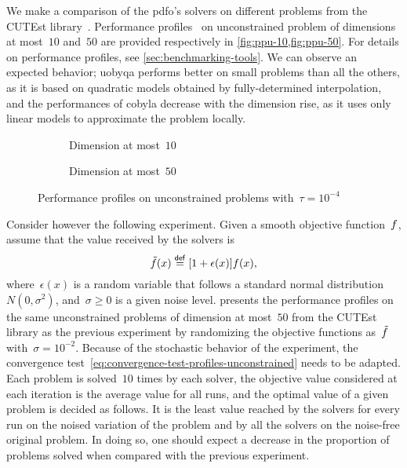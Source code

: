 We make a comparison of the \gls{pdfo}'s solvers on different problems from the CUTEst library~\cite{Gould_Orban_Toint_2015}.
Performance profiles~\cite{Dolan_More_2002,More_Wild_2009} on unconstrained problem of dimensions at most~$10$ and~$50$ are provided respectively in \cref{fig:ppu-10,fig:ppu-50}.
For details on performance profiles, see \cref{sec:benchmarking-tools}.
We can observe an expected behavior; \gls{uobyqa} performs better on small problems than all the others, as it is based on quadratic models obtained by fully-determined interpolation, and the performances of \gls{cobyla} decrease with the dimension rise, as it uses only linear models to approximate the problem locally.

\begin{figure}[ht]
    \begin{subfigure}[b]{0.49\textwidth}
        \centering
        \caption{Dimension at most~$10$}
        \label{fig:ppu-10}
    \end{subfigure}
    \hfill
    \begin{subfigure}[b]{0.49\textwidth}
        \centering
        \caption{Dimension at most~$50$}
        \label{fig:ppu-50}
    \end{subfigure}
    \caption{Performance profiles on unconstrained problems with~$\tau = 10^{-4}$}
\end{figure}

Consider however the following experiment.
Given a smooth objective function~$f$, assume that the value received by the solvers is
\begin{equation*}
    \tilde{\obj}(\iter) \eqdef [1 + \epsilon(\iter)] \obj(\iter),
\end{equation*}
where~$\epsilon(x)$ is a random variable that follows a standard normal distribution~$N(0, \sigma^2)$, and~$\sigma \ge 0$ is a given noise level.
 presents the performance profiles on the same unconstrained problems of dimension at most~$50$ from the CUTEst library as the previous experiment by randomizing the objective functions as~$\tilde{f}$ with~$\sigma = 10^{-2}$.
Because of the stochastic behavior of the experiment, the convergence test~\cref{eq:convergence-test-profiles-unconstrained} needs to be adapted.
Each problem is solved~$10$ times by each solver, the objective value considered at each iteration is the average value for all runs, and the optimal value of a given problem is decided as follows.
It is the least value reached by the solvers for every run on the noised variation of the problem and by all the solvers on the noise-free original problem.
In doing so, one should expect a decrease in the proportion of problems solved when compared with the previous experiment.

